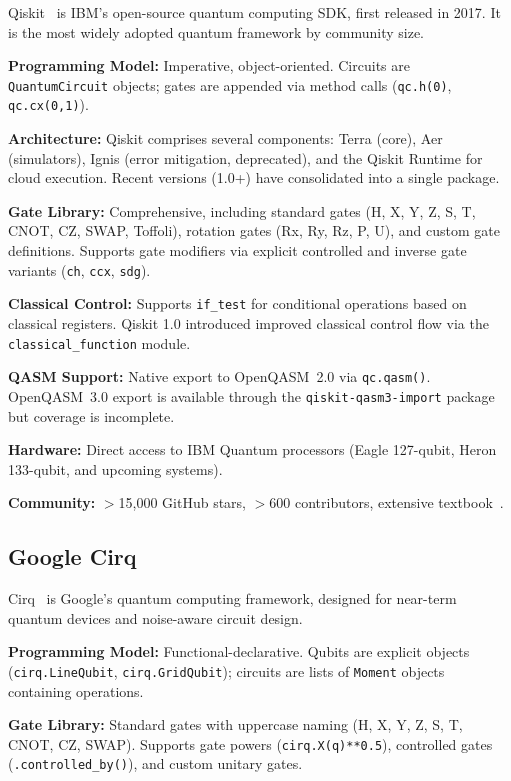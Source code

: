 \documentclass[journal]{IEEEtran}
\begin{document}
Qiskit~\cite{qiskit2024} is IBM's open-source quantum computing SDK, first released in 2017. It is the most widely adopted quantum framework by community size.

\textbf{Programming Model:} Imperative, object-oriented. Circuits are \texttt{QuantumCircuit} objects; gates are appended via method calls (\texttt{qc.h(0)}, \texttt{qc.cx(0,1)}).

\textbf{Architecture:} Qiskit comprises several components: Terra (core), Aer (simulators), Ignis (error mitigation, deprecated), and the Qiskit Runtime for cloud execution. Recent versions (1.0+) have consolidated into a single package.

\textbf{Gate Library:} Comprehensive, including standard gates (H, X, Y, Z, S, T, CNOT, CZ, SWAP, Toffoli), rotation gates (Rx, Ry, Rz, P, U), and custom gate definitions. Supports gate modifiers via explicit controlled and inverse gate variants (\texttt{ch}, \texttt{ccx}, \texttt{sdg}).

\textbf{Classical Control:} Supports \texttt{if\_test} for conditional operations based on classical registers. Qiskit 1.0 introduced improved classical control flow via the \texttt{classical\_function} module.

\textbf{QASM Support:} Native export to OpenQASM~2.0 via \texttt{qc.qasm()}. OpenQASM~3.0 export is available through the \texttt{qiskit-qasm3-import} package but coverage is incomplete.

\textbf{Hardware:} Direct access to IBM Quantum processors (Eagle 127-qubit, Heron 133-qubit, and upcoming systems).

\textbf{Community:} $>$15,000 GitHub stars, $>$600 contributors, extensive textbook~\cite{wootton2021teaching}.

\subsection{Google Cirq}

Cirq~\cite{cirq2024} is Google's quantum computing framework, designed for near-term quantum devices and noise-aware circuit design.

\textbf{Programming Model:} Functional-declarative. Qubits are explicit objects (\texttt{cirq.LineQubit}, \texttt{cirq.GridQubit}); circuits are lists of \texttt{Moment} objects containing operations.

\textbf{Gate Library:} Standard gates with uppercase naming (H, X, Y, Z, S, T, CNOT, CZ, SWAP). Supports gate powers (\texttt{cirq.X(q)**0.5}), controlled gates (\texttt{.controlled\_by()}), and custom unitary gates.
\end{document}
